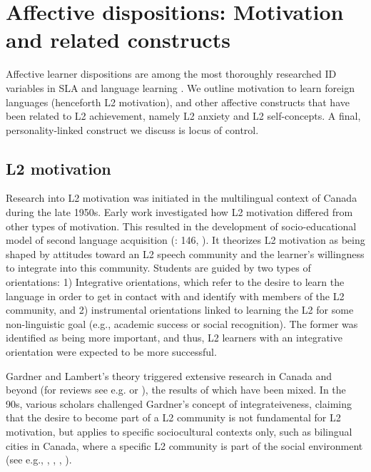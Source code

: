 \documentclass[output=paper]{langscibook}
\begin{document}
\section{Affective dispositions: Motivation and related constructs}\label{sec:01:4}

\begin{sloppypar}
Affective learner dispositions are among the most thoroughly researched ID variables in SLA and language learning \citep[536]{Ellis2004}. We outline motivation to learn foreign languages (henceforth L2 motivation), and other affective constructs that have been related to L2 achievement, namely L2 anxiety and L2 self-concepts. A final, personality-linked construct we discuss is locus of control.
\end{sloppypar} 

\subsection{L2 motivation} %

Research into L2 motivation was initiated in the multilingual context of Canada during the late 1950s. Early work investigated how L2 motivation differed from other types of motivation. This resulted in the development of  socio-educational model of second language acquisition (\citealt{Gardner1985}: 146, \citealt{Gardner2000}). It theorizes L2 motivation as being shaped by attitudes toward an L2 speech community and the learner’s willingness to integrate into this community. Students are guided by two types of orientations: 1) Integrative orientations, which refer to the desire to learn the language in order to get in contact with and identify with members of the L2 community, and 2) instrumental orientations linked to learning the L2 for some non-linguistic goal (e.g., academic success or social recognition). The former was identified as being more important, and thus, L2 learners with an integrative orientation were expected to be more successful.

Gardner and Lambert’s theory triggered extensive research in Canada and beyond (for reviews see e.g. \citealt{Gardner1985} or \citealt{Au1988}), the results of which have been mixed. In the 90s, various scholars challenged Gardner’s concept of integrateiveness, claiming that the desire to become part of a L2 community is not fundamental for L2 motivation, but applies to specific sociocultural contexts only, such as bilingual cities in Canada, where a specific L2 community is part of the social environment (see e.g., \citealt{NoelsClement1989}, \citealt{Doernyei1990}, \citealt{MoiseEtAl1990}, \citealt{ClémentEtAl1994}). 
\end{document}
